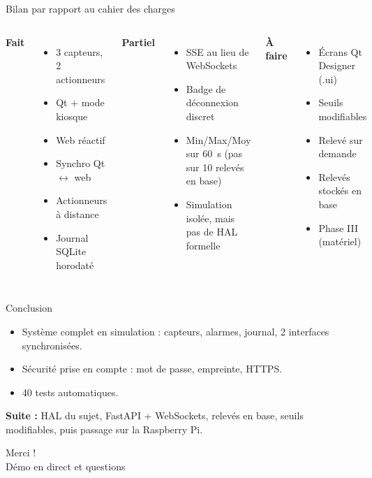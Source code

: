 \documentclass[aspectratio=169,11pt]{beamer}
\begin{document}
\begin{frame}{Bilan par rapport au cahier des charges}
\small
\begin{columns}[T]
\textcolor{ok}{\textbf{Fait}}
\begin{itemize}
  \item 3 capteurs, 2 actionneurs
  \item Qt + mode kiosque
  \item Web réactif
  \item Synchro Qt $\leftrightarrow$ web
  \item Actionneurs à distance
  \item Journal SQLite horodaté
\end{itemize}
\textcolor{partiel}{\textbf{Partiel}}
\begin{itemize}
  \item SSE au lieu de WebSockets
  \item Badge de déconnexion discret
  \item Min/Max/Moy sur 60~s (pas sur 10 relevés en base)
  \item Simulation isolée, mais pas de HAL formelle
\end{itemize}
\textcolor{non}{\textbf{À faire}}
\begin{itemize}
  \item Écrans Qt Designer (.ui)
  \item Seuils modifiables
  \item Relevé sur demande
  \item Relevés stockés en base
  \item Phase III (matériel)
\end{itemize}
\end{columns}
\end{frame}

\begin{frame}{Conclusion}
\begin{itemize}
  \item Système complet en simulation : capteurs, alarmes, journal, 2 interfaces synchronisées.
  \item Sécurité prise en compte : mot de passe, empreinte, HTTPS.
  \item 40 tests automatiques.
\end{itemize}
\bigskip
\textbf{Suite :} HAL du sujet, FastAPI + WebSockets, relevés en base, seuils modifiables, puis passage sur la Raspberry Pi.
\end{frame}

\begin{frame}[standout]
Merci !\\[0.5em]
\normalsize Démo en direct et questions
\end{frame}
\end{document}
